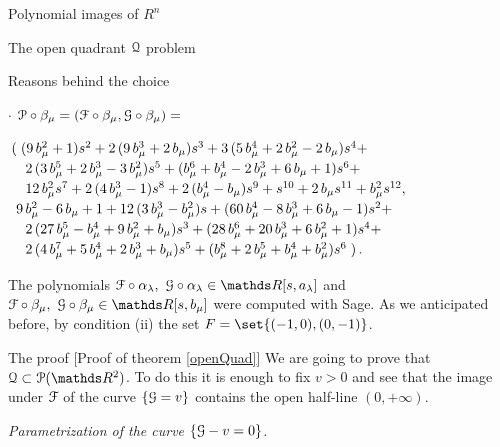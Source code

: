 \documentclass[11pt, a4paper, english, twoside, notitlepage, openright]{report}
\begin{document}
\begin{chapter}{Polynomial images of $R^n$}
\begin{section}{The open quadrant $\mathcal{Q}$ problem}
\begin{subsection}{Reasons behind the choice}
\begin{enumerate}[(i)]
$\cdot$ $\mathcal{P}\circ\beta_{\mu}=(\mathcal{F}\circ\beta_{\mu},\mathcal{G}\circ\beta_{\mu})=
$
				
				$\arraycolsep=2pt\def\arraystretch{1.2}
\begin{array}{l}
\left(\right.{(9 \,b_{\mu}^{2}+1)}s^{2}+2 \,{(9 \,b_{\mu}^{3}+2\,b_{\mu})}s^{3}+3\,{(5\,b_{\mu}^{4}+2\,b_{\mu}^{2}-2\,b_{\mu})}s^{4}+\\
\quad 2\,{(3 \,b_{\mu}^{5}+2\,b_{\mu}^{3}-3\,b_{\mu}^{2})}s^{5}+{(b_{\mu}^{6}+b_{\mu}^{4}-2\,b_{\mu}^{3}+6\,b_{\mu}+1)} s^{6}+\\
\quad 12\,b_{\mu}^{2} s^{7}+2\,{(4\,b_{\mu}^{3}-1)}s^{8}+2\,{(b_{\mu}^{4}-b_{\mu})}s^{9}+s^{10}+2\,b_{\mu}s^{11}+b_{\mu}^{2} s^{12},\\
					\ 9 \, b_{\mu}^{2}-6 \, b_{\mu}+1+12 \, {(3 \, b_{\mu}^{3} - b_{\mu}^{2})} s+{(60\, b_{\mu}^{4} - 8 \, b_{\mu}^{3}+6 \, b_{\mu}-1)}s^{2} + \\
					\quad 2 \, {(27\,b_{\mu}^{5}-b_{\mu}^{4}+9\,b_{\mu}^{2}+b_{\mu})}s^{3}+{(28\,b_{\mu}^{6}+20\,b_{\mu}^{3}+6\,b_{\mu}^{2}+1)} s^{4}+\\
					\quad2\,{(4\,b_{\mu}^{7}+5\,b_{\mu}^{4}+2\,b_{\mu}^{3}+b_{\mu})}s^{5}+{(b_{\mu}^{8}+2\,b_{\mu}^{5}+ b_{\mu}^{4} +b_{\mu}^{2})} s^{6}\left.\right).
					\end{array}
$
\end{enumerate}
The polynomials $\F\circ\alpha_{\lambda },\ \G\circ\alpha_{\lambda}\in\R[s,a_{\lambda}]$ and $\F\circ\beta_{\mu},\ \G\circ\beta_{\mu}\in\R[s,b_{\mu}]$ were computed with Sage. As we anticipated before, by condition (ii) the set $F=\set{(-1, 0),(0,-1)}$.
\end{subsection}
\begin{subsection}{The proof} [Proof of theorem \ref{openQuad}] We are going to prove that $\Qu\subset\P(\R^2)$. To do this it is enough to fix $v>0$ and see that the image under $\mathcal{F}$ of the curve $\{\mathcal{G}=v\}$ contains the open half-line $(0,+\infty)$.
\begin{center}
 \emph{Parametrization of the curve $\{\mathcal{G}-v=0\}$.}
\end{center}\label{step1}


\end{subsection}
\end{section}
\end{chapter}
\end{document}
